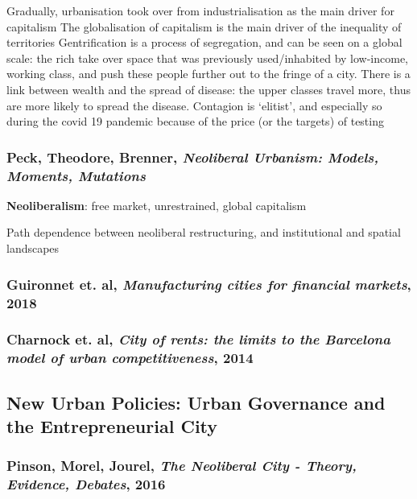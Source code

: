 \documentclass{article}
\begin{document}
\begin{outline}
		\2 Gradually, urbanisation took over from industrialisation as the main driver for capitalism The globalisation of capitalism is the main driver of the inequality of territories
		\2  Gentrification is a process of segregation, and can be seen on a global scale: the rich take over space that was previously used/inhabited by low-income, working class, and push these people further out to the fringe of a city.
		\2 There is a link between wealth and the spread of disease: the upper classes travel more, thus are more likely to spread the disease. Contagion is `elitist', and especially so during the covid 19 pandemic because of the price (or the targets) of testing
\end{outline}

\subsubsection{Peck, Theodore, Brenner, \textit{Neoliberal Urbanism: Models, Moments, Mutations}}

\textbf{Neoliberalism}: free market, unrestrained, global capitalism

\begin{outline}
	\1 Path dependence between neoliberal restructuring, and institutional and spatial landscapes
\end{outline}

\subsubsection{Guironnet et. al, \textit{Manufacturing cities for financial markets}, 2018}

\subsubsection{Charnock et. al, \textit{City of rents: the limits to the Barcelona model of urban competitiveness}, 2014}

\subsection{New Urban Policies: Urban Governance and the Entrepreneurial City}

\subsubsection{Pinson, Morel, Jourel, \textit{The Neoliberal City - Theory, Evidence, Debates}, 2016}
\end{document}
